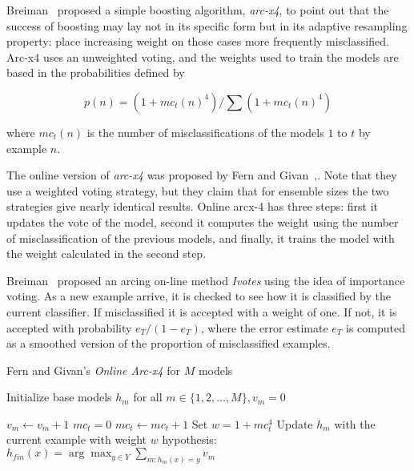 Breiman~\cite{arcing} 
proposed a simple boosting algorithm, {\em arc-x4}, to point out that the success of boosting may lay not in its specific form but in its adaptive resampling property: place increasing weight on those cases more frequently misclassified.  Arc-x4 uses an unweighted voting, and the weights used to train the models are based in the probabilities defined by

$$ p(n)= ( 1+ mc_{t}(n)^4)/ \sum(1+mc_{t}(n)^ 4)$$ 

where $mc_{t}(n)$ is the number of misclassifications of the models  $1$ to $t$ by example $n$.

The online version of {\em arc-x4} was proposed by Fern and Givan~\cite{onlinearcx4},. %
Note that they use a weighted voting strategy, but they claim that for ensemble sizes the two strategies give nearly identical results. Online arcx-4 has three steps: first it updates the vote of the model, second it computes the weight using the number of misclassification of the previous models, and finally, it trains the model with the weight calculated in the second step.



Breiman~\cite{ivotes} proposed an arcing on-line method {\em Ivotes} using the idea of importance voting. As a new example arrive, it is checked to see how it is classified by the current classifier. If misclassified it is accepted with a weight of one. If not, it is accepted with probability $e_T/(1-e_T)$, where the error estimate $e_T$ is computed as a smoothed version of the proportion of misclassified examples.
\ENDOMIT
\BEGINOMIT
\begin{algorithm}
\caption{Fern and Givan's {\em Online Arc-x4} for $M$ models} %
\begin{algorithmic}[1]
\STATE Initialize base models $h_{m}$ for all $m \in \{1,2,...,M\}, v_{m} = 0$

\STATE $v_{m} \gets v_{m}+1$
\ENDIF
\STATE $mc_t = 0$
\STATE $mc_t \gets mc_t +1$
\ENDIF
\ENDFOR
\STATE Set $w =  1 + mc_{t}^{4}$ %
\STATE Update $h_{m}$ with the current example with weight $w$
\ENDFOR
\ENDFOR
{}
\RETURN hypothesis: $h_{fin}(x) = \arg \max_{y \in Y} \sum_{m:h_{m}(x)=y} v_{m}$
\end{algorithmic}
\label{alg:arcx4}
\end{algorithm}


